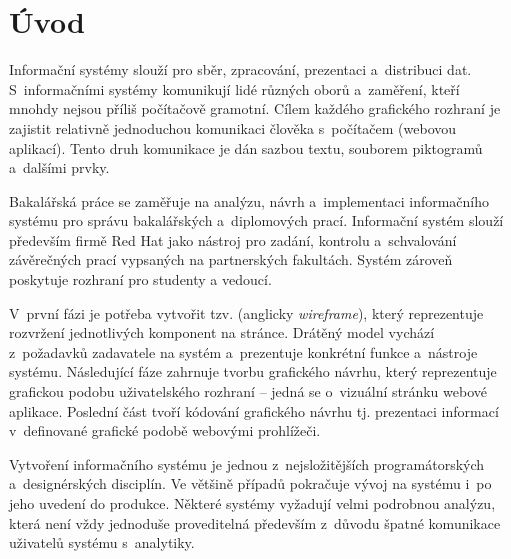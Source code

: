 \chapter{Úvod}

Informační systémy slouží pro sběr, zpracování, prezentaci a~distribuci dat. S~informačními systémy komunikují lidé různých oborů a~zaměření, kteří mnohdy nejsou příliš počítačově gramotní. Cílem každého grafického rozhraní je zajistit relativně jednoduchou komunikaci člověka s~počítačem (webovou aplikací). Tento druh komunikace je dán sazbou textu, souborem piktogramů a~dalšími prvky.

Bakalářská práce se zaměřuje na analýzu, návrh a~implementaci informačního systému pro správu bakalářských a~diplomových prací. Informační systém slouží především firmě Red Hat jako nástroj pro zadání, kontrolu a~schvalování závěrečných prací vypsaných na partnerských fakultách. Systém zároveň poskytuje rozhraní pro studenty a vedoucí.

V~první fázi je potřeba vytvořit tzv.  (anglicky \textit{wireframe}), který reprezentuje rozvržení jednotlivých komponent na stránce. Drátěný model vychází z~požadavků zadavatele na systém a~prezentuje konkrétní funkce a~nástroje systému. Následující fáze zahrnuje tvorbu grafického návrhu, který reprezentuje grafickou podobu uživatelského rozhraní -- jedná se o~vizuální stránku webové aplikace. Poslední část tvoří kódování grafického návrhu tj. prezentaci informací v~definované grafické podobě webovými prohlížeči.

Vytvoření informačního systému je jednou z~nejsložitějších programátorských a~designérských disciplín. Ve většině případů pokračuje vývoj na systému i~po jeho uvedení do produkce. Některé systémy vyžadují velmi podrobnou analýzu, která není vždy jednoduše proveditelná především z~důvodu špatné komunikace uživatelů systému s~analytiky.
